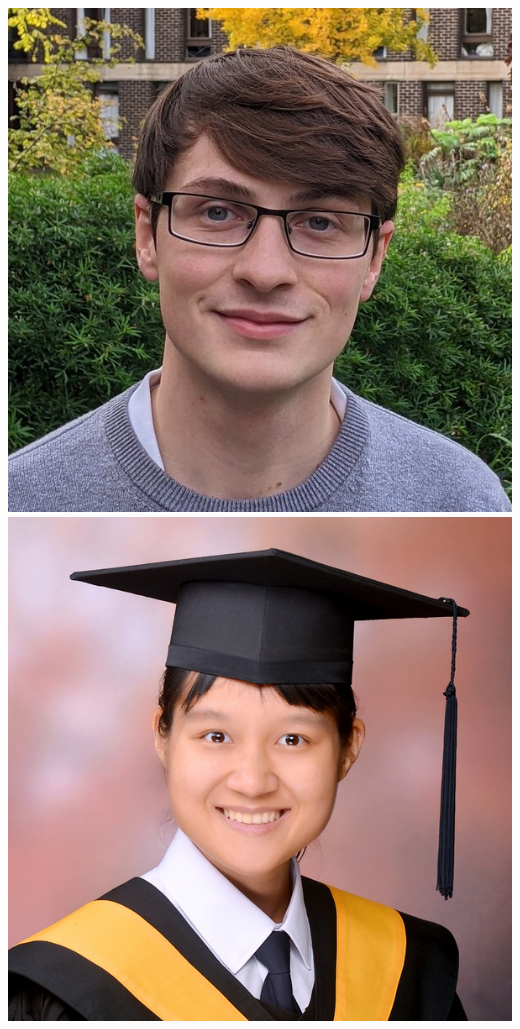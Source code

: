 \documentclass[aspectratio=169]{beamer}
\begin{document}
\begin{frame}
{        \includegraphics[width=0.09\textheight]{figures/students/thomas_gessey-jones.jpg}%
        \includegraphics[width=0.09\textheight]{figures/students/wei-ning_deng.jpg}%
}
\end{frame}
\end{document}
